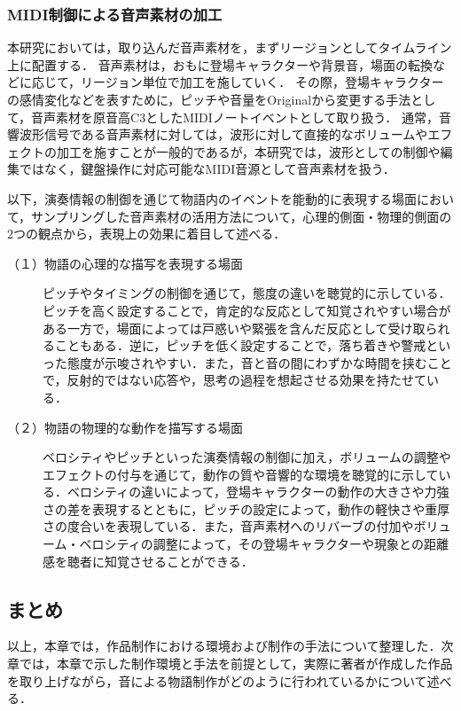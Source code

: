 


\subsubsection{MIDI制御による音声素材の加工}
本研究においては，取り込んだ音声素材を，まずリージョンとしてタイムライン上に配置する．
音声素材は，おもに登場キャラクターや背景音，場面の転換などに応じて，リージョン単位で加工を施していく．
その際，登場キャラクターの感情変化などを表すために，ピッチや音量をOriginalから変更する手法として，音声素材を原音高C3としたMIDIノートイベントとして取り扱う．
通常，音響波形信号である音声素材に対しては，波形に対して直接的なボリュームやエフェクトの加工を施すことが一般的であるが，本研究では，波形としての制御や編集ではなく，鍵盤操作に対応可能なMIDI音源として音声素材を扱う．

以下，演奏情報の制御を通じて物語内のイベントを能動的に表現する場面において，サンプリングした音声素材の活用方法について，心理的側面・物理的側面の2つの観点から，表現上の効果に着目して述べる．

\begin{description}
  \item[（１）物語の心理的な描写を表現する場面] ピッチやタイミングの制御を通じて，態度の違いを聴覚的に示している．ピッチを高く設定することで，肯定的な反応として知覚されやすい場合がある一方で，場面によっては戸惑いや緊張を含んだ反応として受け取られることもある．逆に，ピッチを低く設定することで，落ち着きや警戒といった態度が示唆されやすい．また，音と音の間にわずかな時間を挟むことで，反射的ではない応答や，思考の過程を想起させる効果を持たせている．

  \item[（２）物語の物理的な動作を描写する場面] ベロシティやピッチといった演奏情報の制御に加え，ボリュームの調整やエフェクトの付与を通じて，動作の質や音響的な環境を聴覚的に示している．ベロシティの違いによって，登場キャラクターの動作の大きさや力強さの差を表現するとともに，ピッチの設定によって，動作の軽快さや重厚さの度合いを表現している．また，音声素材へのリバーブの付加やボリューム・ベロシティの調整によって，その登場キャラクターや現象との距離感を聴者に知覚させることができる．

\end{description}

\subsection{まとめ}
以上，本章では，作品制作における環境および制作の手法について整理した．次章では，本章で示した制作環境と手法を前提として，実際に著者が作成した作品を取り上げながら，音による物語制作がどのように行われているかについて述べる．


